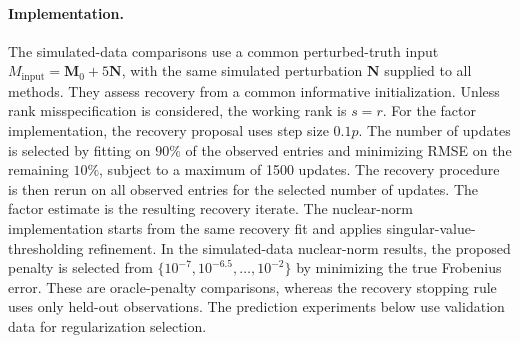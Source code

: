 \documentclass[numsec,webpdf,modern,large,namedate]{oup-authoring-template}
\theoremstyle{plain}
\theoremstyle{remark}
\newcommand{\M}{\bm{M}}
\newif\ifmarkchanges
\newenvironment{revision}{\begingroup\ifmarkchanges\color{red}\fi}{\endgroup}
\begin{document}
\begin{revision}
\paragraph{Implementation.}
\label{sec:simulation_implementation}
The simulated-data comparisons use a common perturbed-truth input $M_{\mathrm{input}}=\M_0+5\bm N$, with the same simulated perturbation $\bm N$ supplied to all methods. They assess recovery from a common informative initialization. Unless rank misspecification is considered, the working rank is $s=r$.
For the factor implementation, the recovery proposal uses step size $0.1p$. The number of updates is selected by fitting on $90\%$ of the observed entries and minimizing RMSE on the remaining $10\%$, subject to a maximum of 1500 updates. The recovery procedure is then rerun on all observed entries for the selected number of updates. The factor estimate is the resulting recovery iterate. The nuclear-norm implementation starts from the same recovery fit and applies singular-value-thresholding refinement.
In the simulated-data nuclear-norm results, the proposed penalty is selected from $\{10^{-7},10^{-6.5},\ldots,10^{-2}\}$ by minimizing the true Frobenius error. These are oracle-penalty comparisons, whereas the recovery stopping rule uses only held-out observations. The prediction experiments below use validation data for regularization selection.


\end{revision}
\end{document}
